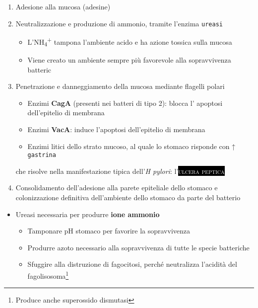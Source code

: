 \documentclass[italian,]{article}
\providecommand{\tightlist}{%
  \setlength{\itemsep}{0pt}\setlength{\parskip}{0pt}}
\newcommand{\pat}[1]{\colorbox{black}{\textcolor{white}{\textsc{#1}}}}
\begin{document}
\begin{enumerate}
\def\labelenumi{\arabic{enumi}.}
\tightlist
\item
  Adesione alla mucosa (adesine)
\item
  Neutralizzazione e produzione di ammonio, tramite l'enzima
  \texttt{ureasi}

  \begin{itemize}
  \tightlist
  \item
    L'NH\textsubscript{4}\textsuperscript{+} tampona l'ambiente acido e
    ha azione tossica sulla mucosa
  \item
    Viene creato un ambiente sempre più favorevole alla sopravvivenza
    batteric
  \end{itemize}
\item
  Penetrazione e danneggiamento della mucosa mediante flagelli polari

  \begin{itemize}
  \tightlist
  \item
    Enzimi \textbf{CagA} (presenti nei batteri di tipo 2): blocca l'
    apoptosi dell'epitelio di membrana
  \item
    Enzimi \textbf{VacA}: induce l'apoptosi dell'epitelio di membrana
  \item
    Enzimi litici dello strato mucoso, al quale lo stomaco risponde con
    ↑ \texttt{gastrina}
  \end{itemize}

  che risolve nella manifestazione tipica dell'\emph{H pylori}:
  l'\pat{ulcera peptica}
\item
  Consolidamento dell'adesione alla parete epiteliale dello stomaco e
  colonizzazione definitiva dell'ambiente dello stomaco da parte del
  batterio
\end{enumerate}

\begin{itemize}
\tightlist
\item
  Ureasi necessaria per produrre \textbf{ione ammonio}

  \begin{itemize}
  \tightlist
  \item
    Tamponare pH stomaco per favorire la sopravvivenza
  \item
    Produrre azoto necessario alla sopravvivenza di tutte le specie
    batteriche
  \item
    Sfuggire alla distruzione di fagocitosi, perché neutralizza
    l'acidità del fagolisosoma\footnote{Produce anche superossido
      dismutasi}
  \end{itemize}
\end{itemize}
\end{document}
